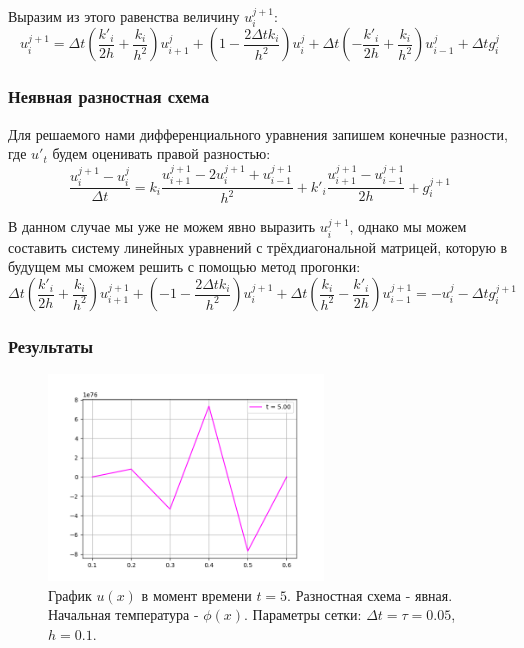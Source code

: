 \documentclass[12pt]{article}%
\begin{document}
Выразим из этого равенства величину $u^{j+1}_i$:
\begin{equation*}
u^{j+1}_{i} = 
\Delta t \left( \frac{k'_i}{2h} + \frac{k_i}{h^2} \right) u^{j}_{i+1} + 
\left( 1 - \frac{2 \Delta t k_i}{h^2} \right) u^{j}_{i} + 
\Delta t \left( -\frac{k'_i}{2h} + \frac{k_i}{h^2} \right) u^{j}_{i-1} + 
\Delta t g^j_{i}
\end{equation*}

\subsubsection{Неявная разностная схема}
Для решаемого нами дифференциального уравнения запишем конечные разности, где $u'_t$ будем оценивать правой разностью:
\begin{equation*}
    \frac{u_i^{j+1} - u_i^{j}}{\Delta t} = 
    k_i \frac{u^{j+1}_{i+1} - 2u^{j+1}_i + u^{j+1}_{i-1}}{h^2} +
    k'_i \frac{u^{j+1}_{i+1} - u^{j+1}_{i-1}}{2h} + g^{j+1}_i
\end{equation*}

В данном случае мы уже не можем явно выразить $u^{j+1}_i$, однако мы можем составить систему линейных уравнений с трёхдиагональной матрицей, которую в будущем мы сможем решить с помощью метод прогонки:
\begin{equation*}
\Delta t \left( \frac{k'_i}{2h} + \frac{k_i}{h^2} \right) u_{i+1}^{j+1} +
\left( - 1 - \frac{2 \Delta t k_i}{h^2} \right) u_{i}^{j+1} + 
\Delta t \left( \frac{k_i}{h^2} - \frac{k'_i}{2h} \right) u_{i-1}^{j+1} =
-u_i^j - \Delta t g_i^{j+1}
\end{equation*}

\subsubsection{Результаты}
\begin{figure}[H]
    \centering
    \includegraphics[width=0.65\textwidth]{explicit-failure.png}
    \caption{График $u(x)$ в момент времени $t=5$. Разностная схема - явная. Начальная температура - $\phi(x)$. Параметры сетки: $\Delta t = \tau = 0.05$, $h=0.1$.}
\end{figure}
\end{document}
